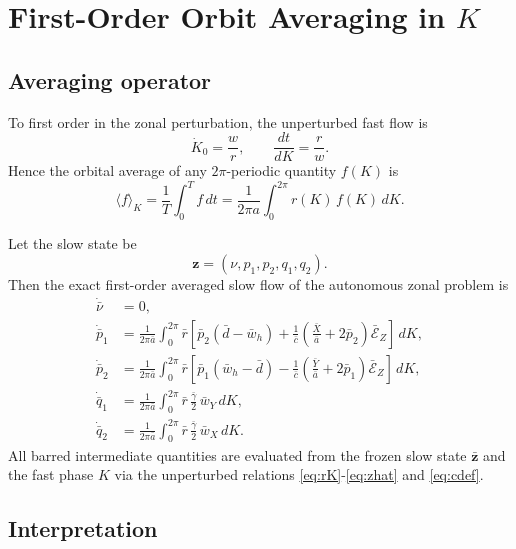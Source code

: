 \documentclass[11pt]{article}
\begin{document}
\section{First-Order Orbit Averaging in \texorpdfstring{$K$}{K}}
\label{sec:avg}

\subsection{Averaging operator}

To first order in the zonal perturbation, the unperturbed fast flow is
\begin{equation}
\dot{K}_0 = \frac{w}{r},
\qquad
\frac{dt}{dK} = \frac{r}{w}.
\end{equation}
Hence the orbital average of any $2\pi$-periodic quantity $f(K)$ is
\begin{equation}
\langle f \rangle_K
= \frac{1}{T}\int_0^T f\,dt
= \frac{1}{2\pi a}\int_0^{2\pi} r(K)\,f(K)\,dK.
\label{eq:avg_operator}
\end{equation}

Let the slow state be
\begin{equation}
\bm{z} = (\nu,p_1,p_2,q_1,q_2).
\end{equation}
Then the exact first-order averaged slow flow of the autonomous zonal problem is
\begin{align}
\dot{\bar\nu} &= 0, \\
\dot{\bar p}_1 &=
\frac{1}{2\pi \bar a}\int_0^{2\pi} \bar r
\left[
\bar p_2(\bar d-\bar w_h)
+ \frac{1}{\bar c}\left(\frac{\bar X}{\bar a}+2\bar p_2\right)\bar{\mathcal E}_Z
\right]\,dK, \label{eq:avg_p1_general}\\
\dot{\bar p}_2 &=
\frac{1}{2\pi \bar a}\int_0^{2\pi} \bar r
\left[
\bar p_1(\bar w_h-\bar d)
- \frac{1}{\bar c}\left(\frac{\bar Y}{\bar a}+2\bar p_1\right)\bar{\mathcal E}_Z
\right]\,dK, \label{eq:avg_p2_general}\\
\dot{\bar q}_1 &=
\frac{1}{2\pi \bar a}\int_0^{2\pi}
\bar r \,\frac{\bar\gamma}{2}\,\bar w_Y\,dK, \label{eq:avg_q1_general}\\
\dot{\bar q}_2 &=
\frac{1}{2\pi \bar a}\int_0^{2\pi}
\bar r \,\frac{\bar\gamma}{2}\,\bar w_X\,dK. \label{eq:avg_q2_general}
\end{align}
All barred intermediate quantities are evaluated from the frozen slow state
$\bar{\bm z}$ and the fast phase $K$ via the unperturbed relations
\eqref{eq:rK}-\eqref{eq:zhat} and \eqref{eq:cdef}.

\subsection{Interpretation}
\end{document}

